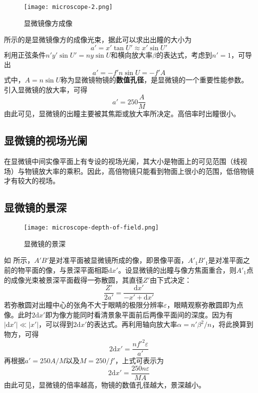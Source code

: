 \documentclass[cn,10pt,chinesefont=founder,math=newtx,cite=super,twoside]{elegantbook}
\begin{document}
\begin{figure}[htbp]
	\centering
	\texttt{[image: microscope-2.png]}
	\caption{显微镜像方成像}
	\label{fig:microscope-2}
\end{figure}

 所示的是显微镜像方的成像光束，据此可以求出出瞳的大小为
\begin{equation}
a'=x'\tan U'\approx x'\sin U'
\end{equation}
利用正弦条件$n'y'\sin U'=ny\sin U$和横向放大率$\beta$的表达式，考虑到$n'=1$，可导出
\begin{equation}
a'=-f'n\sin U=-f'A
\end{equation}
式中，$A=n\sin U$称为显微镜物镜的\textbf{数值孔径}，是显微镜的一个重要性能参数。引入显微镜的放大率，可得
\begin{equation}
a'=250\frac{A}{M}
\end{equation}
由此可见，显微镜的出瞳主要被其焦距或放大率所决定。高倍率时出瞳很小。

\subsection{显微镜的视场光阑}
在显微镜中间实像平面上有专设的视场光阑，其大小是物面上的可见范围（线视场）与物镜放大率的乘积。因此，高倍物镜只能看到物面上很小的范围，低倍物镜才有较大的视场。

\subsection{显微镜的景深}

\begin{figure}[htbp]
	\centering
	\texttt{[image: microscope-depth-of-field.png]}
	\caption{显微镜的景深}
	\label{fig:microscope-depth-of-field}
\end{figure}

如 所示，$A'B'$是对准平面被显微镜所成的像，即景像平面，$A'_1B'_1$是对准平面之前的物平面的像，与景深平面相距$\mathrm{d}x'$。设显微镜的出瞳与像方焦面重合，则$A'_1$点的成像光束被景深平面截得一弥散圆，其直径$Z'$由下式决定：
\begin{equation}
\frac{Z'}{2a'}=\frac{\mathrm{d}x'}{-x'+\mathrm{d}x'}
\end{equation}
若弥散圆对出瞳中心的张角不大于眼睛的极限分辨率$\varepsilon$，眼睛观察弥散圆即为点像。此时$2\mathrm{d}x'$即为像方能同时看清景象平面前后两像平面间的深度。因为有$|\mathrm{d}x'|\ll|x'|$，可以得到$2\mathrm{d}x'$的表达式。再利用轴向放大率$\alpha=n'\beta^2/n$，将此换算到物方，可得
\begin{equation}
2\mathrm{d}x'=\frac{nf'^2\varepsilon}{a'}
\end{equation}
再根据$a'=250A/M$以及$M=250/f'$，上式可表示为
\begin{equation}
2\mathrm{d}x'=\frac{250n\varepsilon}{MA}
\end{equation}
由此可见，显微镜的倍率越高，物镜的数值孔径越大，景深越小。
\end{document}
